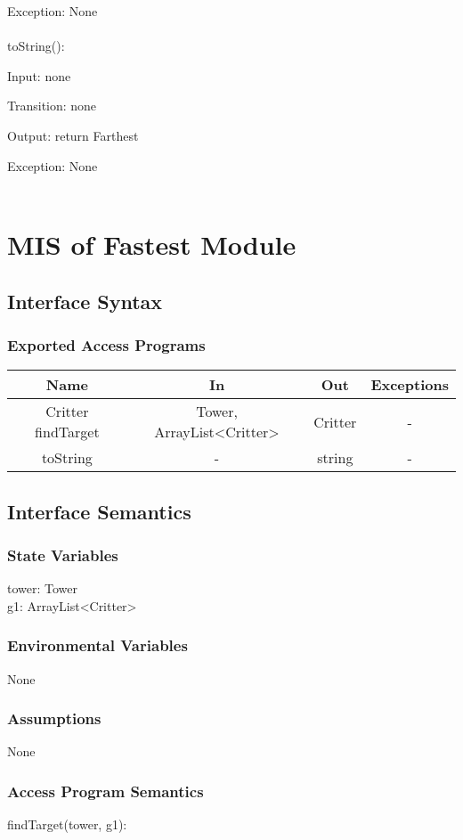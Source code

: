 \documentclass[12,english]{article}
\begin{document}
		Exception: None\\
		\\
		toString():
		
		Input: none
		
		Transition: none
		
		Output: return Farthest 
		
		Exception: None\\
		\\      
\section{MIS of Fastest Module}
	\subsection{Interface Syntax}
		\subsubsection{Exported Access Programs}
		
	\begin{tabular}[pos]{|c|c|c|c|}
	\hline
	\textbf{Name}& \textbf{In} & \textbf{Out} & \textbf{Exceptions} \\ 
	\hline
	Critter findTarget & Tower, ArrayList<Critter> & Critter & - \\ \hline
	toString & - & string & - \\ \hline
					
	\end{tabular}		
		
	\subsection{Interface Semantics}
		\subsubsection{State Variables}
		tower: Tower\\
	    g1: ArrayList<Critter>\\
		\subsubsection{Environmental Variables}
		None
		\subsubsection{Assumptions}
        None

		\subsubsection{Access Program Semantics}
		findTarget(tower, g1):
		
\end{document}
